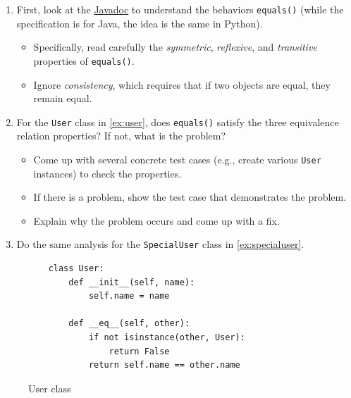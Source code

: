 \documentclass[oneside,11pt,dvipsnames]{book}
\newcommand{\code}[1]{\texttt{#1}}
\begin{document}
\begin{enumerate}
    \item First, look at the \href{https://docs.oracle.com/javase/8/docs/api/java/lang/Object.html#equals-java.lang.Object-}{Javadoc} to understand the behaviors \code{equals()} (while the specification is for Java, the idea is the same in Python).
    \begin{itemize}
        \item Specifically, read carefully the \emph{symmetric}, \emph{reflexive}, and \emph{transitive} properties of \code{equals()}.
        \item Ignore \emph{consistency}, which requires that if two objects are equal, they remain equal.
    \end{itemize}    
    \item For the \code{User} class in \autoref{ex:user}, does \code{equals()} satisfy the three equivalence relation properties? If not, what is the problem?
    \begin{itemize}
        \item Come up with several concrete test cases (e.g., create various \code{User} instances) to check the properties.
        \item If there is a problem, show the test case that demonstrates the problem.
        \item Explain why the problem occurs and come up with a fix.
    \end{itemize}
    \item Do the same analysis for the \code{SpecialUser} class in \autoref{ex:specialuser}.
    \end{enumerate}
    
    

\begin{figure}
\begin{lstlisting}
    class User:
        def __init__(self, name):
            self.name = name

        def __eq__(self, other):
            if not isinstance(other, User):
                return False
            return self.name == other.name
\end{lstlisting}
\caption{User class}\label{ex:user}
\end{figure}
\end{document}
